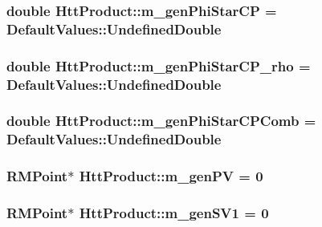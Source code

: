 \label{classHttProduct_a8d816230bd59c76d77a3833858e8434c}
\hypertarget{classHttProduct_a080bded07e8508ff0e09577f95340002}{
\subsubsection[{m\_\-genPhiStarCP}]{\setlength{\rightskip}{0pt plus 5cm}double {\bf HttProduct::m\_\-genPhiStarCP} = DefaultValues::UndefinedDouble}}
\label{classHttProduct_a080bded07e8508ff0e09577f95340002}
\hypertarget{classHttProduct_a64b92a877f8d6ad7a514214e1929c342}{
\subsubsection[{m\_\-genPhiStarCP\_\-rho}]{\setlength{\rightskip}{0pt plus 5cm}double {\bf HttProduct::m\_\-genPhiStarCP\_\-rho} = DefaultValues::UndefinedDouble}}
\label{classHttProduct_a64b92a877f8d6ad7a514214e1929c342}
\hypertarget{classHttProduct_a169478ca381091cb1692885ad0a5bac4}{
\subsubsection[{m\_\-genPhiStarCPComb}]{\setlength{\rightskip}{0pt plus 5cm}double {\bf HttProduct::m\_\-genPhiStarCPComb} = DefaultValues::UndefinedDouble}}
\label{classHttProduct_a169478ca381091cb1692885ad0a5bac4}
\hypertarget{classHttProduct_a62c0b404f4cbf75e58a963c62466dadc}{
\subsubsection[{m\_\-genPV}]{\setlength{\rightskip}{0pt plus 5cm}RMPoint$\ast$ {\bf HttProduct::m\_\-genPV} = 0}}
\label{classHttProduct_a62c0b404f4cbf75e58a963c62466dadc}
\hypertarget{classHttProduct_ae3617dc56d9ef3bb87dacb354286f3fb}{
\subsubsection[{m\_\-genSV1}]{\setlength{\rightskip}{0pt plus 5cm}RMPoint$\ast$ {\bf HttProduct::m\_\-genSV1} = 0}}
